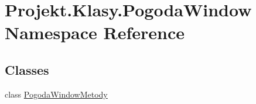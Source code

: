 \hypertarget{namespace_projekt_1_1_klasy_1_1_pogoda_window}{}\section{Projekt.\+Klasy.\+Pogoda\+Window Namespace Reference}
\label{namespace_projekt_1_1_klasy_1_1_pogoda_window}
\subsection*{Classes}
\begin{DoxyCompactItemize}
\item 
class \mbox{\hyperlink{class_projekt_1_1_klasy_1_1_pogoda_window_1_1_pogoda_window_metody}{Pogoda\+Window\+Metody}}
\end{DoxyCompactItemize}
